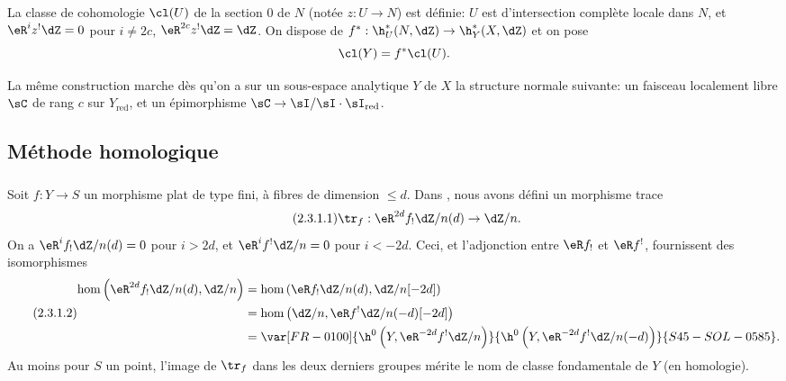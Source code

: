 La classe de cohomologie $\cl(U)$ de la section $0$ de $N$ (notée $z:U\to N$) 
est définie: $U$ est d'intersection complète locale dans $N$, et 
$\eR^i z^!\dZ = 0$ pour $i\ne 2 c$, $\eR^{2 c} z^!\dZ = \dZ$. On dispose de 
$f^*:\h_U^*(N,\dZ) \to \h_Y^*(X,\dZ)$ et on pose 
\[
  \cl(Y) = f^*\cl(U) \text{.}
\]

La même construction marche dès qu'on a sur un sous-espace analytique $Y$ 
de $X$ la structure normale suivante: un faisceau localement libre $\sC$ de 
rang $c$ sur $Y_\text{red}$, et un épimorphisme 
$\sC\to \sI/\sI\cdot \sI_\text{red}$. 










\subsection{Méthode homologique}\label{IV:2-3}





\subsubsection{}\label{IV:2-3-1}

Soit $f:Y\to S$ un morphisme plat de type fini, à fibres de dimension 
$\leqslant d$. Dans , nous avons défini un morphisme 
trace 
\begin{equation*}\tag{2.3.1.1}\label{IV:eq:2-3-1-1}
  \tr_f:\eR^{2 d} f_! \dZ/n(d) \to \dZ/n \text{.}
\end{equation*}
On a $\eR^i f_!\dZ/n(d)=0$ pour $i>2 d$, et $\eR^i f^!\dZ/n=0$ pour $i<-2 d$. 
Ceci, et l'adjonction entre $\eR f_!$ et $\eR f^!$, fournissent des isomorphismes 
\begin{equation*}\tag{2.3.1.2}\label{IV:eq:2-3-1-2}
\begin{aligned}
  \hom\left(\eR^{2 d}f_!\dZ/n(d),\dZ/n\right) 
    &= \hom\left(\eR f_!\dZ/n(d),\dZ/n[-2 d]\right) \\
    &= \hom\left(\dZ/n,\eR f^!\dZ/n(-d)[-2 d]\right) \\
    &= \var[FR-0100]{\h^0\left(Y,\eR^{-2 d}f^!\dZ/n\right)}{\h^0\left(Y,\eR^{-2 d}f^!\dZ/n(-d)\right)}{S45-SOL-0585} \text{.}
\end{aligned}
\end{equation*}
Au moins pour $S$ un point, l'image de $\tr_f$ dans les deux derniers groupes 
mérite le nom de classe fondamentale de $Y$ (en homologie). 


